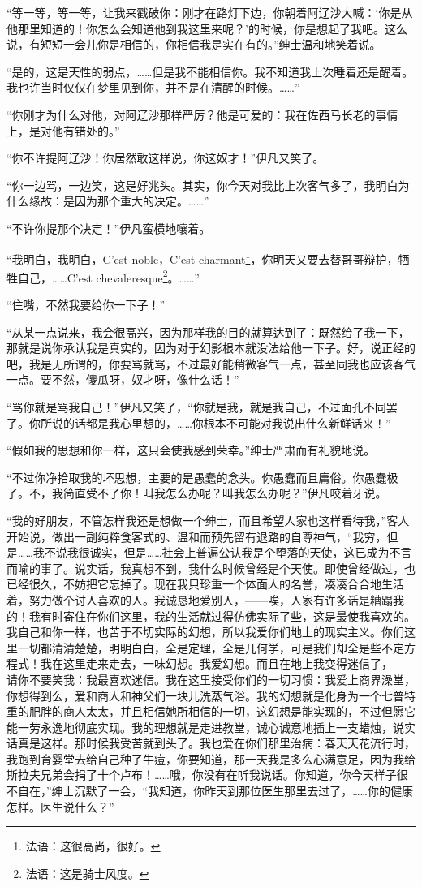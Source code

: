 \par “等一等，等一等，让我来戳破你：刚才在路灯下边，你朝着阿辽沙大喊：‘你是从他那里知道的！你怎么会知道他到我这里来呢？’的时候，你是想起了我吧。这么说，有短短一会儿你是相信的，你相信我是实在有的。”绅士温和地笑着说。
\par “是的，这是天性的弱点，……但是我不能相信你。我不知道我上次睡着还是醒着。我也许当时仅仅在梦里见到你，并不是在清醒的时候。……”
\par “你刚才为什么对他，对阿辽沙那样严厉？他是可爱的：我在佐西马长老的事情上，是对他有错处的。”
\par “你不许提阿辽沙！你居然敢这样说，你这奴才！”伊凡又笑了。
\par “你一边骂，一边笑，这是好兆头。其实，你今天对我比上次客气多了，我明白为什么缘故：是因为那个重大的决定。……”
\par “不许你提那个决定！”伊凡蛮横地嚷着。
\par “我明白，我明白，C’est noble，C’est charmant\footnote{法语：这很高尚，很好。}，你明天又要去替哥哥辩护，牺牲自己，……C’est chevaleresque\footnote{法语：这是骑士风度。}。……”
\par “住嘴，不然我要给你一下子！”
\par “从某一点说来，我会很高兴，因为那样我的目的就算达到了：既然给了我一下，那就是说你承认我是真实的，因为对于幻影根本就没法给他一下子。好，说正经的吧，我是无所谓的，你要骂就骂，不过最好能稍微客气一点，甚至同我也应该客气一点。要不然，傻瓜呀，奴才呀，像什么话！”
\par “骂你就是骂我自己！”伊凡又笑了，“你就是我，就是我自己，不过面孔不同罢了。你所说的话都是我心里想的，……你根本不可能对我说出什么新鲜话来！”
\par “假如我的思想和你一样，这只会使我感到荣幸。”绅士严肃而有礼貌地说。
\par “不过你净拾取我的坏思想，主要的是愚蠢的念头。你愚蠢而且庸俗。你愚蠢极了。不，我简直受不了你！叫我怎么办呢？叫我怎么办呢？”伊凡咬着牙说。
\par “我的好朋友，不管怎样我还是想做一个绅士，而且希望人家也这样看待我，”客人开始说，做出一副纯粹食客式的、温和而预先留有退路的自尊神气，“我穷，但是……我不说我很诚实，但是……社会上普遍公认我是个堕落的天使，这已成为不言而喻的事了。说实话，我真想不到，我什么时候曾经是个天使。即使曾经做过，也已经很久，不妨把它忘掉了。现在我只珍重一个体面人的名誉，凑凑合合地生活着，努力做个讨人喜欢的人。我诚恳地爱别人，——唉，人家有许多话是糟蹋我的！我有时寄住在你们这里，我的生活就过得仿佛实际了些，这是最使我喜欢的。我自己和你一样，也苦于不切实际的幻想，所以我爱你们地上的现实主义。你们这里一切都清清楚楚，明明白白，全是定理，全是几何学，可是我们却全是些不定方程式！我在这里走来走去，一味幻想。我爱幻想。而且在地上我变得迷信了，——请你不要笑我：我最喜欢迷信。我在这里接受你们的一切习惯：我爱上商界澡堂，你想得到么，爱和商人和神父们一块儿洗蒸气浴。我的幻想就是化身为一个七普特重的肥胖的商人太太，并且相信她所相信的一切，这幻想是能实现的，不过但愿它能一劳永逸地彻底实现。我的理想就是走进教堂，诚心诚意地插上一支蜡烛，说实话真是这样。那时候我受苦就到头了。我也爱在你们那里治病：春天天花流行时，我跑到育婴堂去给自己种了牛痘，你要知道，那一天我是多么心满意足，因为我给斯拉夫兄弟会捐了十个卢布！……哦，你没有在听我说话。你知道，你今天样子很不自在，”绅士沉默了一会，“我知道，你昨天到那位医生那里去过了，……你的健康怎样。医生说什么？”
